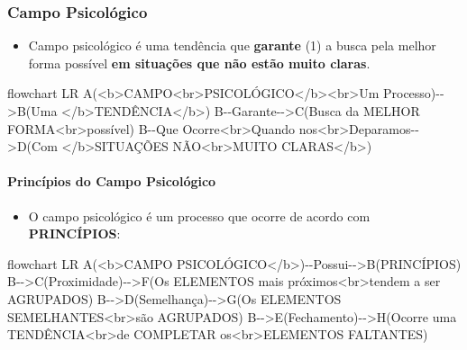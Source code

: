 \documentclass[
]{book}
\newenvironment{Shaded}{\begin{snugshade}}{\end{snugshade}}
\newcommand{\NormalTok}[1]{#1}
\providecommand{\tightlist}{%
  \setlength{\itemsep}{0pt}\setlength{\parskip}{0pt}}
\begin{document}
\hypertarget{campo-psicoluxf3gico}{%
\subsubsection{Campo Psicológico}\label{campo-psicoluxf3gico}}

\begin{itemize}
\tightlist
\item
  Campo psicológico é uma tendência que \textbf{garante} (1) a busca
  pela melhor forma possível \textbf{em situações que não estão muito
  claras}.
\end{itemize}

\begin{Shaded}
\begin{Highlighting}[]
\NormalTok{flowchart LR}
\NormalTok{A(\textless{}b\textgreater{}CAMPO\textless{}br\textgreater{}PSICOLÓGICO\textless{}/b\textgreater{}\textless{}br\textgreater{}Um Processo){-}{-}\textgreater{}B(Uma \textless{}/b\textgreater{}TENDÊNCIA\textless{}/b\textgreater{})}
\NormalTok{B{-}{-}Garante{-}{-}\textgreater{}C(Busca da MELHOR FORMA\textless{}br\textgreater{}possível)}
\NormalTok{B{-}{-}Que Ocorre\textless{}br\textgreater{}Quando nos\textless{}br\textgreater{}Deparamos{-}{-}\textgreater{}D(Com \textless{}/b\textgreater{}SITUAÇÕES NÃO\textless{}br\textgreater{}MUITO CLARAS\textless{}/b\textgreater{})}
\end{Highlighting}
\end{Shaded}

\hypertarget{princuxedpios-do-campo-psicoluxf3gico}{%
\paragraph{Princípios do Campo
Psicológico}\label{princuxedpios-do-campo-psicoluxf3gico}}

\begin{itemize}
\tightlist
\item
  O campo psicológico é um processo que ocorre de acordo com
  \textbf{PRINCÍPIOS}:
\end{itemize}

\begin{Shaded}
\begin{Highlighting}[]
\NormalTok{flowchart LR}
\NormalTok{A(\textless{}b\textgreater{}CAMPO PSICOLÓGICO\textless{}/b\textgreater{}){-}{-}Possui{-}{-}\textgreater{}B(PRINCÍPIOS)}
\NormalTok{B{-}{-}\textgreater{}C(Proximidade){-}{-}\textgreater{}F(Os ELEMENTOS mais próximos\textless{}br\textgreater{}tendem a ser AGRUPADOS)}
\NormalTok{B{-}{-}\textgreater{}D(Semelhança){-}{-}\textgreater{}G(Os ELEMENTOS SEMELHANTES\textless{}br\textgreater{}são AGRUPADOS)}
\NormalTok{B{-}{-}\textgreater{}E(Fechamento){-}{-}\textgreater{}H(Ocorre uma TENDÊNCIA\textless{}br\textgreater{}de COMPLETAR os\textless{}br\textgreater{}ELEMENTOS FALTANTES)}
\end{Highlighting}
\end{Shaded}
\end{document}
